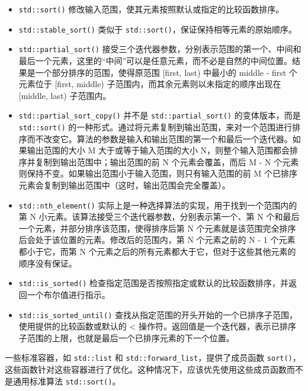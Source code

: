 \begin{itemize}
\item
\verb|std::sort()| 修改输入范围，使其元素按照默认或指定的比较函数排序。

\item
\verb|std::stable_sort()| 类似于 \verb|std::sort()|，保证保持相等元素的原始顺序。

\item
\verb|std::partial_sort()| 接受三个迭代器参数，分别表示范围的第一个、中间和最后一个元素，这里的“中间”可以是任意元素，而不必是自然的中间位置。结果是一个部分排序的范围，使得原范围 [first, last) 中最小的 middle - first 个元素位于 [first, middle) 子范围内，而其余元素则以未指定的顺序出现在 [middle, last) 子范围内。

\item
\verb|std::partial_sort_copy()| 并不是 \verb|std::partial_sort()| 的变体版本，而是 \verb|std::sort()| 的一种形式。通过将元素复制到输出范围，来对一个范围进行排序而不改变它。算法的参数是输入和输出范围的第一个和最后一个迭代器。如果输出范围的大小 M 大于或等于输入范围的大小 N，则整个输入范围都会排序并复制到输出范围中；输出范围的前 N 个元素会覆盖，而后 M - N 个元素则保持不变。如果输出范围小于输入范围，则只有输入范围的前 M 个已排序元素会复制到输出范围中（这时，输出范围会完全覆盖）。

\item
\verb|std::nth_element()| 实际上是一种选择算法的实现，用于找到一个范围内的第 N 小元素。该算法接受三个迭代器参数，分别表示第一个、第 N 个和最后一个元素，并部分排序该范围，使得排序后第 N 个元素就是该范围完全排序后会处于该位置的元素。修改后的范围内，第 N 个元素之前的 N - 1 个元素都小于它，而第 N 个元素之后的所有元素都大于它，但对于这些其他元素的顺序没有保证。

\item
\verb|std::is_sorted()| 检查指定范围是否按照指定或默认的比较函数排序，并返回一个布尔值进行指示。

\item
\verb|std::is_sorted_until()| 查找从指定范围的开头开始的一个已排序子范围，使用提供的比较函数或默认的 < 操作符。返回值是一个迭代器，表示已排序子范围的上限，也就是最后一个已排序元素的下一个位置。
\end{itemize}

一些标准容器，如 \verb|std::list| 和 \verb|std::forward_list|，提供了成员函数 \verb|sort()|，这些函数针对这些容器进行了优化。这种情况下，应该优先使用这些成员函数而不是通用标准算法 \verb|std::sort()|。


